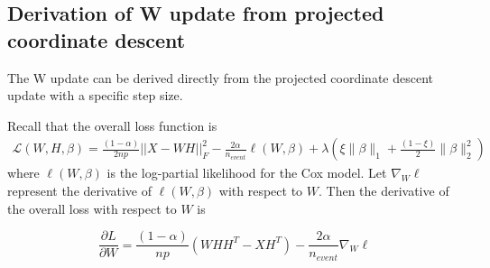 \documentclass[
]{article}
\begin{document}
\subsection{Derivation of W update from projected coordinate descent}

The W update can be derived directly from the projected coordinate
descent update with a specific step size.

Recall that the overall loss function is \begin{align}
    \mathcal{L}(W,H,\beta) = \frac{(1-\alpha)}{2np} ||X - WH||^2_F - \frac{2 \alpha}{n_{event}} \ell(W,\beta) + \lambda\left(\xi\|\beta\|_1 + \frac{(1-\xi)}{2}\|\beta\|_2^2\right)
\end{align} where \(\ell(W,\beta)\) is the log-partial likelihood for
the Cox model. Let \(\nabla_W \ell\) represent the derivative of
\(\ell(W,\beta)\) with respect to \(W\). Then the derivative of the
overall loss with respect to \(W\) is

\begin{equation}
  \frac{\partial L}{\partial W} = \frac{(1-\alpha)}{np}\left( WHH^T - XH^T \right) - \frac{2\alpha}{n_{event}} \nabla_W \ell
\end{equation}
\end{document}
